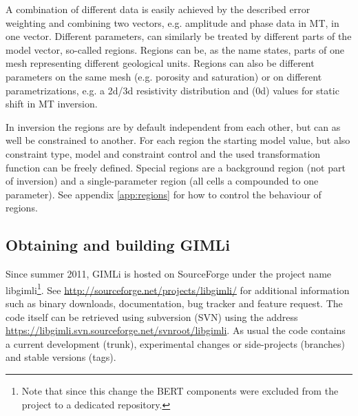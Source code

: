 A combination of different data is easily achieved by the described error weighting and combining two vectors, e.g. amplitude and phase data in MT, in one vector.
Different parameters, can similarly be treated by different parts of the model vector, so-called regions.
Regions can be, as the name states, parts of one mesh representing different geological units.
Regions can also be different parameters on the same mesh (e.g. porosity and saturation) or on different parametrizations, e.g. a 2d/3d resistivity distribution and (0d) values for static shift in MT inversion.

In inversion the regions are by default independent from each other, but can as well be constrained to another.
For each region the starting model value, but also constraint type, model and constraint control and the used transformation function can be freely defined.
Special regions are a background region (not part of inversion) and a single-parameter region (all cells a compounded to one parameter). See appendix \ref{app:regions} for how to control the behaviour of regions.

\subsection{Obtaining and building GIMLi}
Since summer 2011, GIMLi is hosted on SourceForge under the project name libgimli\footnote{Note that since this change the BERT components were excluded from the project to a dedicated repository.}.
See \url{http://sourceforge.net/projects/libgimli/} for additional information such as binary downloads, documentation, bug tracker and feature request.
The code itself can be retrieved using subversion (SVN) using the address \url{https://libgimli.svn.sourceforge.net/svnroot/libgimli}.
As usual the code contains a current development (trunk), experimental changes or side-projects (branches) and stable versions (tags).

